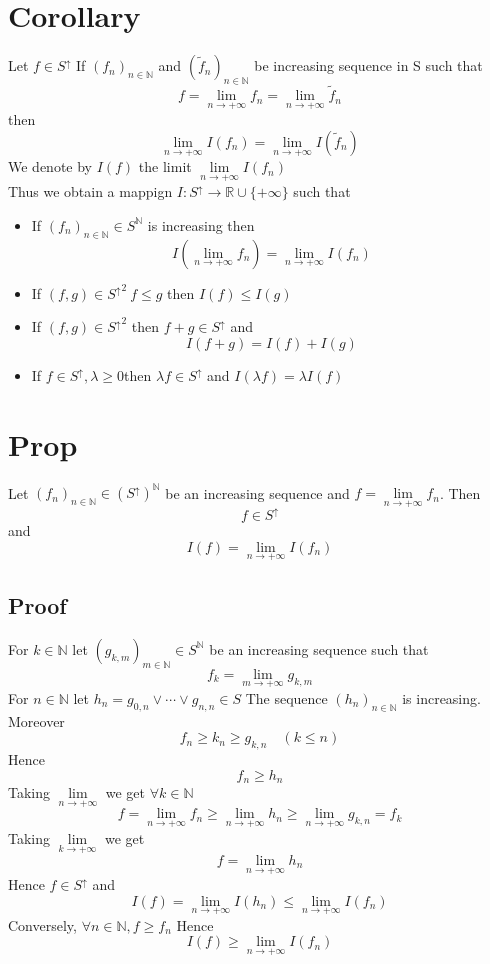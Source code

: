 \documentclass{book}
\begin{document}
\section{Corollary}
Let $f\in S^\uparrow$ If $(f_n)_{n\in \mathbb{N}}$ and $(\widetilde{f}_n)_{n\in\mathbb{N}}$ be increasing sequence in S such that 
$$f=\lim\limits_{n\rightarrow+\infty}f_n=\lim\limits_{n\rightarrow+\infty}\widetilde{f}_n$$
then $$\lim\limits_{n\rightarrow+\infty}I(f_n)=\lim\limits_{n\rightarrow+\infty}I(\widetilde{f}_n)$$
We denote by $I(f)$ the limit $\lim\limits_{n\rightarrow+\infty}I(f_n)$
\\Thus we obtain a mappign $I:S^\uparrow\rightarrow\mathbb{R}\cup\{+\infty\}$
such that \begin{itemize}
    \item If $(f_n)_{n\in \mathbb{N}}\in S^\mathbb{N}$ is increasing then $$I(\lim\limits_{n\rightarrow+\infty}f_n)=\lim\limits_{n\rightarrow+\infty}I(f_n)$$
    \item If $(f,g)\in {S^\uparrow}^2\ f\leq g$ then $I(f)\leq I(g)$
    \item If $(f,g)\in {S^\uparrow}^2$ then $f+g\in S^\uparrow$ and $$I(f+g)=I(f)+I(g)$$
    \item If $f\in S^\uparrow,\lambda\geq0$then $\lambda f\in S^\uparrow$ and $I(\lambda f)=\lambda I(f)$
\end{itemize}
\section{Prop}
Let $(f_n)_{n\in \mathbb{N}}\in (S^\uparrow)^\mathbb{N}$ be an increasing sequence and $f=\lim\limits_{n\rightarrow+\infty}f_n$. Then $$f\in S^\uparrow$$
and $$I(f)=\lim\limits_{n\rightarrow+\infty}I(f_n)$$
\subsection*{Proof}
For $k\in \mathbb{N}$ let $(g_{k,m})_{m\in \mathbb{N}}\in S^\mathbb{N}$ be an increasing sequence such that $$f_k=\lim\limits_{m\rightarrow+\infty}g_{k,m}$$
For $n\in \mathbb{N}$ let $h_n=g_{0,n}\vee\cdots\vee g_{n,n}\in S$
The sequence $(h_n)_{n\in \mathbb{N}}$ is increasing. Moreover $$f_n\geq k_n\geq g_{k,n}\quad (k\leq n)$$ Hence $$f_n\geq h_n$$
Taking $\lim\limits_{n\rightarrow+\infty}$ we get $\forall k\in \mathbb{N}$
$$f=\lim\limits_{n\rightarrow+\infty}f_n\geq\lim\limits_{n\rightarrow+\infty} h_n\geq\lim\limits_{n\rightarrow+\infty}g_{k,n}=f_k$$
Taking $\lim\limits_{k\rightarrow+\infty}$ we get 
$$f=\lim\limits_{n\rightarrow+\infty} h_n$$
Hence $f\in S^\uparrow$ and $$I(f)=\lim\limits_{n\rightarrow+\infty}I(h_n)\leq\lim\limits_{n\rightarrow+\infty}I(f_n)$$
Conversely, $\forall n\in \mathbb{N},f\geq f_n$ Hence $$I(f)\geq\lim\limits_{n\rightarrow+\infty}I(f_n)$$
\end{document}
